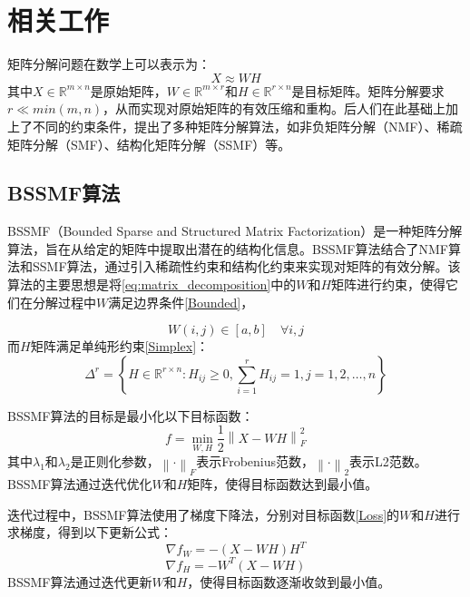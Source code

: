 \documentclass[12pt]{article}
\begin{document}
\newpage
\section{相关工作}
矩阵分解问题在数学上可以表示为：
\begin{equation}
    X \approx WH
    \label{eq:matrix_decomposition}
\end{equation}
其中$X\in \mathbb{R}^{m \times n}$是原始矩阵，$W \in \mathbb{R}^{m \times r}$和$H \in \mathbb{R}^{r \times n}$是目标矩阵。矩阵分解要求$r\ll min(m, n)$\cite{NMFIdentifiability}，从而实现对原始矩阵的有效压缩和重构。后人们在此基础上加上了不同的约束条件，提出了多种矩阵分解算法，如非负矩阵分解（NMF）\cite{NMF}、稀疏矩阵分解（SMF）\cite{SMF}、结构化矩阵分解（SSMF）\cite{SSMF2}\cite{SSMF1}等。
\subsection{BSSMF算法}
BSSMF（Bounded Sparse and Structured Matrix Factorization）\cite{BSSMF}是一种矩阵分解算法，旨在从给定的矩阵中提取出潜在的结构化信息。BSSMF算法结合了NMF算法和SSMF算法，通过引入稀疏性约束和结构化约束来实现对矩阵的有效分解。该算法的主要思想是将\eqref{eq:matrix_decomposition}中的$W$和$H$矩阵进行约束，使得它们在分解过程中$W$满足边界条件\eqref{Bounded}，

\begin{equation}
    W(i,j) \in [a, b] \quad \forall i,j
    \label{Bounded}
\end{equation}
而$H$矩阵满足单纯形约束\eqref{Simplex}：
\begin{equation}
    \Delta^r = \left\{ H \in \mathbb{R}^{r \times n} : H_{ij} \geq 0, \sum_{i=1}^{r} H_{ij} = 1, j=1,2,\ldots,n \right\}
    \label{Simplex}
\end{equation}

BSSMF算法的目标是最小化以下目标函数：
\begin{equation}
    f = \min_{W,H} \frac{1}{2}\left\lVert X - WH \right\rVert_F^2 
    \label{Loss}
\end{equation}
其中$\lambda_1$和$\lambda_2$是正则化参数，$\left\lVert \cdot \right\rVert_F$表示Frobenius范数，$\left\lVert \cdot \right\rVert_2$表示L2范数。BSSMF算法通过迭代优化$W$和$H$矩阵，使得目标函数达到最小值。

迭代过程中，BSSMF算法使用了梯度下降法，分别对目标函数\eqref{Loss}的$W$和$H$进行求梯度，得到以下更新公式：
\begin{equation}
    \nabla f_W = -\left( X - WH \right)H^T
    \label{Gradient_W}
\end{equation}
\begin{equation}
    \nabla f_H = -W^T\left( X - WH \right)
    \label{Gradient_H}
\end{equation}
BSSMF算法通过迭代更新$W$和$H$，使得目标函数逐渐收敛到最小值。
\end{document}
